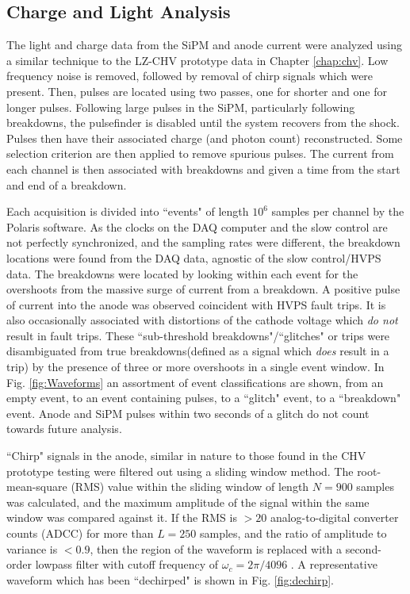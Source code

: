 \subsection{Charge and Light Analysis}
\label{sec:chargeamp_ana}
The light and charge data from the SiPM and anode current were analyzed using a similar technique to the LZ-CHV prototype data in Chapter \ref{chap:chv}.
Low frequency noise is removed, followed by removal of chirp signals which were present.
Then, pulses are located using two passes, one for shorter and one for longer pulses.
Following large pulses in the SiPM, particularly following breakdowns, the pulsefinder is disabled until the system recovers from the shock.
Pulses then have their associated charge (and photon count) reconstructed.
Some selection criterion are then applied to remove spurious pulses.
The current from each channel is then associated with breakdowns and given a time from the start and end of a breakdown.

Each acquisition is divided into ``events" of length $10^6$ samples per channel by the Polaris software\cite{suerfu_polaris_2018}.
As the clocks on the DAQ computer and the slow control are not perfectly synchronized, and the sampling rates were different, the breakdown locations were found from the DAQ data, agnostic of the slow control/HVPS data.
The breakdowns were located by looking within each event for the overshoots from the massive surge of current from a breakdown. 
A positive pulse of current into the anode was observed coincident with HVPS fault trips.
It is also occasionally associated with distortions of the cathode voltage which \textit{do not} result in fault trips.
These ``sub-threshold breakdowns"/``glitches" or trips were disambiguated from true breakdowns(defined as a signal which \textit{does} result in a trip) by the presence of three or more overshoots in a single event window.
In Fig. \ref{fig:Waveforms} an assortment of event classifications are shown, from an empty event, to an event containing pulses, to a ``glitch" event, to a ``breakdown" event.
Anode and SiPM pulses within two seconds of a glitch do not count towards future analysis.



``Chirp" signals in the anode, similar in nature to those found in the CHV prototype testing were filtered out using a sliding window method.
The root-mean-square (RMS) value within the sliding window of length $N=900$ samples was calculated, and the maximum amplitude of the signal within the same window was compared against it.
If the RMS is $>20$ analog-to-digital converter counts (ADCC) for more than $L=250$ samples, and the ratio of amplitude to variance is $<0.9$, then the region of the waveform is replaced with a second-order lowpass filter with cutoff frequency of $\omega_c = 2 \pi / 4096$ .
A representative waveform which has been ``dechirped" is shown in Fig. \ref{fig:dechirp}.


